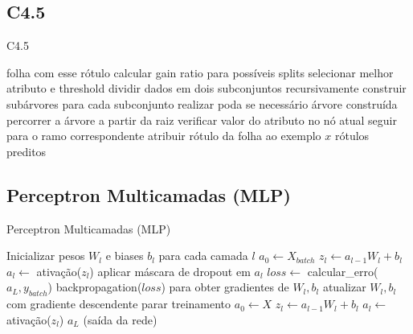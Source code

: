 \documentclass[11pt]{article}
\begin{document}
\subsection{C4.5}
\begin{algorithm}[H]
\caption{C4.5}
\begin{algorithmic}[1]
        \State \Return folha com esse rótulo
    \EndIf
        \State calcular gain ratio para possíveis splits
    \EndFor
    \State selecionar melhor atributo e threshold
    \State dividir dados em dois subconjuntos
    \State recursivamente construir subárvores para cada subconjunto
    \State realizar poda se necessário
    \State \Return árvore construída
\EndProcedure
{}
        \State percorrer a árvore a partir da raiz
            \State verificar valor do atributo no nó atual
            \State seguir para o ramo correspondente
        \EndWhile
        \State atribuir rótulo da folha ao exemplo $x$
    \EndFor
    \State \Return rótulos preditos
\EndProcedure
\end{algorithmic}
\end{algorithm}

\subsection{Perceptron Multicamadas (MLP)}
\begin{algorithm}[H]
\caption{Perceptron Multicamadas (MLP)}
\begin{algorithmic}[1]
    \State Inicializar pesos $W_l$ e biases $b_l$ para cada camada $l$
            \State $a_0 \gets X_{batch}$
                \State $z_l \gets a_{l-1} W_l + b_l$
                \State $a_l \gets$ ativação($z_l$)
                    \State aplicar máscara de dropout em $a_l$
                \EndIf
            \EndFor
            \State $loss \gets$ calcular\_erro($a_L, y_{batch}$)
            \State backpropagation($loss$) para obter gradientes de $W_l, b_l$
            \State atualizar $W_l, b_l$ com gradiente descendente
        \EndFor
            \State parar treinamento
        \EndIf
    \EndFor
\EndProcedure
{}
    \State $a_0 \gets X$
        \State $z_l \gets a_{l-1} W_l + b_l$
        \State $a_l \gets$ ativação($z_l$)
    \EndFor
    \State \Return $a_L$ (saída da rede)
\EndProcedure
\end{algorithmic}
\end{algorithm}
\end{document}
